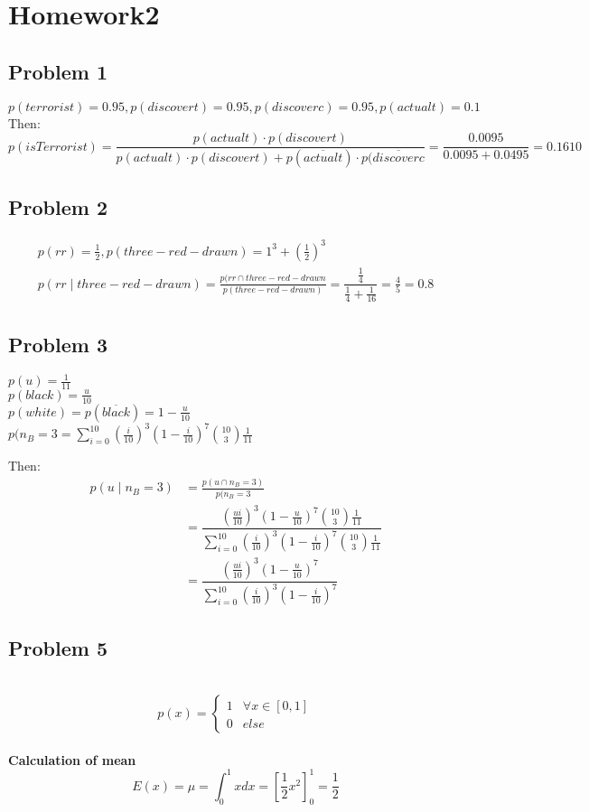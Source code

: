 \section*{Homework2}
\subsection*{Problem 1}
\begin{equation*}
p(terrorist)=0.95,p(discovert)=0.95,p(discoverc)=0.95,p(actualt)=0.1
\end{equation*}
Then:
\begin{equation*}
p(isTerrorist)=\frac{p(actualt)\cdot p(discovert)}{p(actualt)\cdot p(discovert)+p(\overline{actualt})\cdot p(\overline{discoverc}}=\frac{0.0095}{0.0095+0.0495}=0.1610
\end{equation*}

\subsection*{Problem 2}
\begin{align*}
p(rr)=\frac{1}{2},p(three-red-drawn)=1^{3}+(\frac{1}{2})^{3}\\
p(rr\mid three-red-drawn) = \frac{p(rr\cap three-red-drawn}{p(three-red-drawn)} = \dfrac{\frac{1}{4}}{\frac{1}{4}+\frac{1}{16}} = \frac{4}{5} = 0.8
\end{align*}

\subsection*{Problem 3}
$p(u)=\frac{1}{11}$\\
$p(black)=\frac{u}{10}$\\
$p(white)=p(\overline{black})=1-\frac{u}{10}$\\
$p(n_{B}=3 = \sum_{i=0}^{10}(\frac{i}{10})^{3}(1-\frac{i}{10})^{7}\binom{10}{3}\frac{1}{11}$

Then:
\begin{align*}
p(u\mid n_{B}=3)&=\frac{p(u\cap n_{B}=3)}{p(n_{B}=3}\\
				&=\dfrac{(\frac{ui}{10})^{3}(1-\frac{u}{10})^{7}\binom{10}{3}\frac{1}{11}}{\sum_{i=0}^{10}(\frac{i}{10})^{3}(1-\frac{i}{10})^{7}\binom{10}{3}\frac{1}{11}}\\
				&=\dfrac{(\frac{ui}{10})^{3}(1-\frac{u}{10})^{7}}{\sum_{i=0}^{10}(\frac{i}{10})^{3}(1-\frac{i}{10})^{7}}
\end{align*}

\subsection*{Problem 5}\
\[p(x) =
  \begin{cases}
    1	& \forall x\in [0,1]		\\
    0	& else
  \end{cases}
\]\\
\textbf{Calculation of mean}
\begin{equation*}
E(x)=\mu=\int_{0}^{1}xdx=\left[\frac{1}{2}x^2\right]_{0}^{1}=\frac{1}{2}
\end{equation*}

